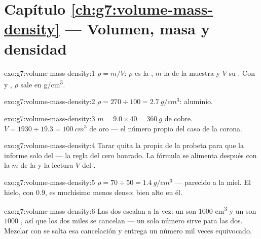 \section*{Capítulo \ref{ch:g7:volume-mass-density} --- Volumen, masa y densidad}

\begin{solution}{exo:g7:volume-mass-density:1}
$\rho = m/V$: $\rho$ es la , $m$ la  de la muestra
y $V$ su . Con  y ,
$\rho$ sale en \unit{g/cm^3}.
\end{solution}

\begin{solution}{exo:g7:volume-mass-density:2}
$\rho = 270 \div 100 = \qty{2.7}{g/cm^3}$: aluminio.
\end{solution}

\begin{solution}{exo:g7:volume-mass-density:3}
$m = 9.0 \times 40 = \qty{360}{g}$ de cobre.
$V = 1930 \div 19.3 = \qty{100}{cm^3}$ de oro --- el número propio
del caso de la corona.
\end{solution}

\begin{solution}{exo:g7:volume-mass-density:4}
Tarar quita la  propia de la probeta para que la 
informe solo del  --- la regla del cero honrado. La fórmula
se alimenta después con la  $m$ de la  y la lectura $V$
del .
\end{solution}

\begin{solution}{exo:g7:volume-mass-density:5}
$\rho = 70 \div 50 = \qty{1.4}{g/cm^3}$ --- parecido a la miel. El
hielo, con $0.9$, es muchísimo menos denso:  bien alto en él.
\end{solution}

\begin{solution}{exo:g7:volume-mass-density:6}
Las dos  escalan a la vez: un  son $1000$
\unit{cm^3} y un  son $1000$ , así que los dos
miles se cancelan --- un solo número sirve para las dos. Mezclar
 con  se salta esa cancelación y entrega un
número mil veces equivocado.
\end{solution}

